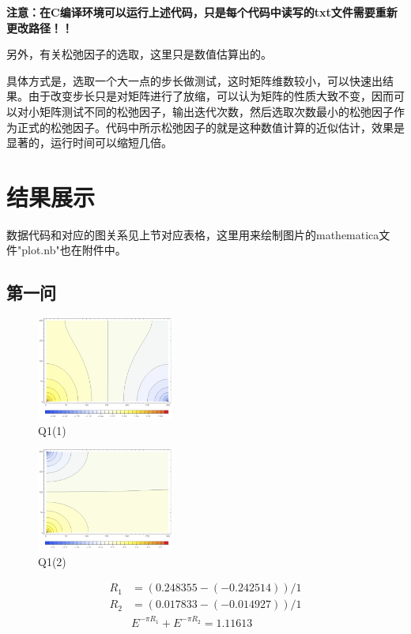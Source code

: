 \documentclass[10pt, a4paper]{article}
\begin{document}
    \textbf{注意：在C编译环境可以运行上述代码，只是每个代码中读写的txt文件需要重新更改路径！！}

    另外，有关松弛因子的选取，这里只是数值估算出的。

    具体方式是，选取一个大一点的步长做测试，这时矩阵维数较小，可以快速出结果。由于改变步长只是对矩阵进行了放缩，可以认为矩阵的性质大致不变，因而可以对小矩阵测试不同的松弛因子，输出迭代次数，然后选取次数最小的松弛因子作为正式的松弛因子。代码中所示松弛因子的就是这种数值计算的近似估计，效果是显著的，运行时间可以缩短几倍。

    \section{结果展示}

    数据代码和对应的图关系见上节对应表格，这里用来绘制图片的mathematica文件"plot.nb"也在附件中。

    \subsection{第一问}
    \begin{figure}[H]
        \centering
        \includegraphics[width=0.4\textwidth]{Q1(1).png}
        \caption{Q1(1)}\label{fig:Q1(1)}
    \end{figure}
    \begin{figure}[H]
        \centering
        \includegraphics[width=0.4\textwidth]{Q1(2).png}
        \caption{Q1(2)}\label{fig:Q1(2)}
    \end{figure}

    \begin{align*}
        R_1&=(0.248355-(-0.242514))/1\\
        R_2&=(0.017833 - (-0.014927))/1\\
        &E^{-\pi R_1}+E^{-\pi R_2}=1.11613
    \end{align*}
\end{document}
